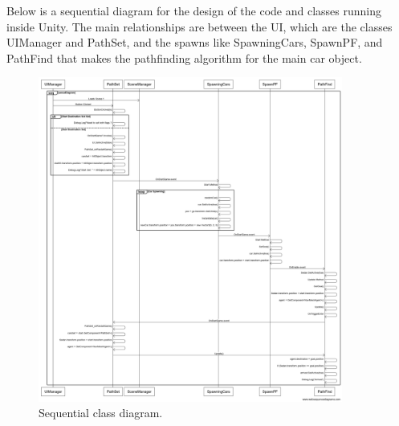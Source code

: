 \begin{flushleft}
Below is a sequential diagram for the design of the code and classes running inside Unity.  The main relationships are between the UI, which are the classes UIManager and PathSet, and the spawns like SpawningCars, SpawnPF, and PathFind that makes the pathfinding algorithm for the main car object. 
\end{flushleft}

\begin{figure}[htb]
    \centering
    \includegraphics[width=10cm]{Images/Sequential.png}
       \caption{Sequential class diagram.}
           \label{Fig:Game}
\end{figure}